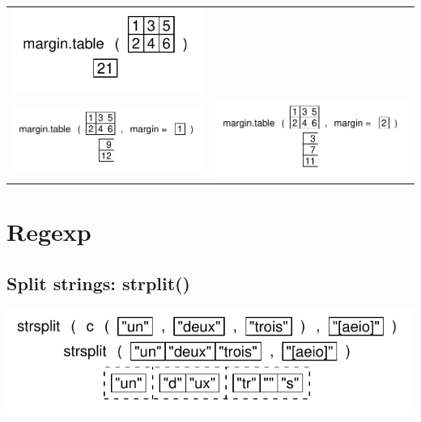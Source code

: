 \documentclass[pdflatex]{article}
\begin{document}
\begin{tabular}{cc}
\includegraphics{margin_table1} & \\
\includegraphics{margin_table_row} &  \includegraphics{margin_table_column}
\end{tabular}


\section{Regexp}

\subsection{Split strings: strplit()}

\includegraphics{strsplit.pdf}
\end{document}

